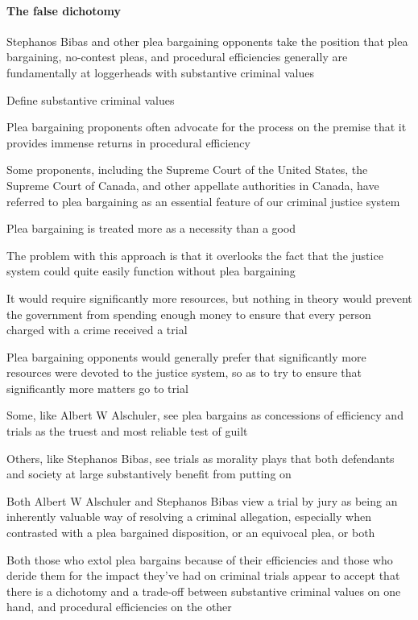 \paragraph{The false dichotomy\\}

Stephanos Bibas and other plea bargaining opponents take the position that plea bargaining, no-contest pleas, and procedural efficiencies generally are fundamentally at loggerheads with substantive criminal values

Define substantive criminal values

Plea bargaining proponents often advocate for the process on the premise that it provides immense returns in procedural efficiency

Some proponents, including the Supreme Court of the United States, the Supreme Court of Canada, and other appellate authorities in Canada, have referred to plea bargaining as an essential feature of our criminal justice system

Plea bargaining is treated more as a necessity than a good

The problem with this approach is that it overlooks the fact that the justice system could quite easily function without plea bargaining

It would require significantly more resources, but nothing in theory would prevent the government from spending enough money to ensure that every person charged with a crime received a trial

Plea bargaining opponents would generally prefer that significantly more resources were devoted to the justice system, so as to try to ensure that significantly more matters go to trial

Some, like Albert W Alschuler, see plea bargains as concessions of efficiency and trials as the truest and most reliable test of guilt

Others, like Stephanos Bibas, see trials as morality plays that both defendants and society at large substantively benefit from putting on

Both Albert W Alschuler and Stephanos Bibas  view a trial by jury as being an inherently valuable way of resolving a criminal allegation, especially when contrasted with a plea bargained disposition, or an equivocal plea, or both

Both those who extol plea bargains because of their efficiencies and those who deride them for the impact they've had on criminal trials appear to accept that there is a dichotomy and a trade-off between substantive criminal values on one hand, and procedural efficiencies on the other


